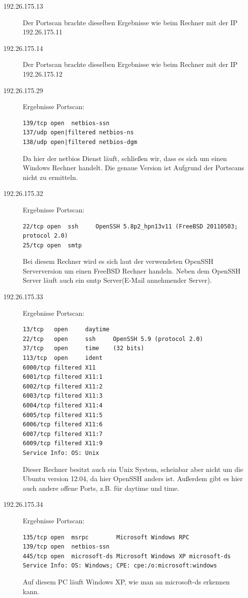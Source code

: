 \documentclass[10pt,a4paper]{article}
\begin{document}
\begin{description}
\item[192.26.175.13]
Der Portscan brachte dieselben Ergebnisse wie beim Rechner mit der IP 192.26.175.11

\item[192.26.175.14]
Der Portscan brachte dieselben Ergebnisse wie beim Rechner mit der IP 192.26.175.12

\item[192.26.175.29] Ergebnisse Portscan:
	\begin{verbatim}
139/tcp open  netbios-ssn
137/udp open|filtered netbios-ns
138/udp open|filtered netbios-dgm
	\end{verbatim}
Da hier der netbios Dienst läuft, schließen wir, dass es sich um einen Windows Rechner handelt. Die genaue Version ist Aufgrund der Portscans nicht zu ermitteln.

\item[192.26.175.32] Ergebnisse Portscan:
\begin{verbatim}
22/tcp open  ssh     OpenSSH 5.8p2_hpn13v11 (FreeBSD 20110503; protocol 2.0)
25/tcp open  smtp
\end{verbatim}
Bei diesem Rechner wird es sich laut der verwendeten OpenSSH Serverversion um einen FreeBSD Rechner handeln. Neben dem OpenSSH Server läuft auch ein smtp Server(E-Mail annehmender Server). 

\item[192.26.175.33] Ergebnisse Portscan:
\begin{verbatim}
13/tcp   open     daytime
22/tcp   open     ssh     OpenSSH 5.9 (protocol 2.0)
37/tcp   open     time    (32 bits)
113/tcp  open     ident
6000/tcp filtered X11
6001/tcp filtered X11:1
6002/tcp filtered X11:2
6003/tcp filtered X11:3
6004/tcp filtered X11:4
6005/tcp filtered X11:5
6006/tcp filtered X11:6
6007/tcp filtered X11:7
6009/tcp filtered X11:9
Service Info: OS: Unix
\end{verbatim}
Dieser Rechner besitzt auch ein Unix System, scheinbar aber nicht um die Ubuntu version 12.04,
da hier OpenSSH anders ist. Außerdem gibt es hier auch andere offene Ports, z.B. für daytime und time.

\item[192.26.175.34] Ergebnisse Portscan:
\begin{verbatim}
135/tcp open  msrpc        Microsoft Windows RPC
139/tcp open  netbios-ssn
445/tcp open  microsoft-ds Microsoft Windows XP microsoft-ds
Service Info: OS: Windows; CPE: cpe:/o:microsoft:windows
\end{verbatim}
Auf diesem PC läuft Windows XP, wie man an microsoft-ds erkennen kann.


\end{description}
\end{document}
